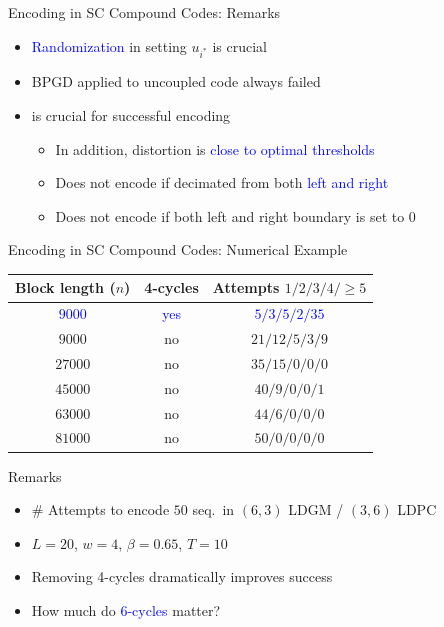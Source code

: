 \documentclass[10pt,presentation]{beamer}
\begin{document}
\begin{frame}{Encoding in SC Compound Codes: Remarks}
  \begin{itemize}
  \item \textcolor{blue}{Randomization} in setting $u_{i^*}$ is crucial \vspace{0.3cm}
  \item BPGD applied to uncoupled code \alert{always failed} \vspace{0.3cm}
  \item {} is crucial for successful encoding \vspace{0.15cm}
    \begin{itemize}
    \item In addition, distortion is \textcolor{blue}{close to optimal thresholds} \vspace{0.2cm}
    \item \alert{Does not encode} if decimated from both \textcolor{blue}{left and right}\vspace{0.2cm}
    \item \alert{Does not encode} if both left and right boundary is set to 0 \vspace{0.2cm}
    \end{itemize}
  \end{itemize}
\end{frame}

\begin{frame}{Encoding in SC Compound Codes: Numerical Example}
  \begin{center}
    \begin{tabular}{|c|c|c|}
      \hline
      Block length ($n$) & 4-cycles & Attempts $1/2/3/4/\geq 5$  \\
      \hline
      \textcolor{blue}{$9000$} & \textcolor{blue}{yes} & \textcolor{blue}{$5/3/5/2/35$} \\
      $9000$ & no & $21/12/5/3/9$ \\
      $27000$ & no & $35/15/0/0/0$ \\
      $45000$ & no & $40/9/0/0/1$ \\
      $63000$ & no & $44/6/0/0/0$ \\
      \alert{$81000$} & \alert{no} & \alert{$50/0/0/0/0$}\\ 
      \hline  
    \end{tabular}
  \end{center}
  \begin{block}{Remarks}
    \begin{itemize}
    \item \# Attempts to encode $50$ seq.~in $(6,3)$ LDGM / $(3,6)$ LDPC
    \item $L=20$, $w=4$, $\beta=0.65$, $T=10$
    \item Removing \alert{4-cycles} dramatically improves success
    \item How much do \textcolor{blue}{6-cycles} matter?
    \end{itemize}
  \end{block}
\end{frame}
\end{document}
